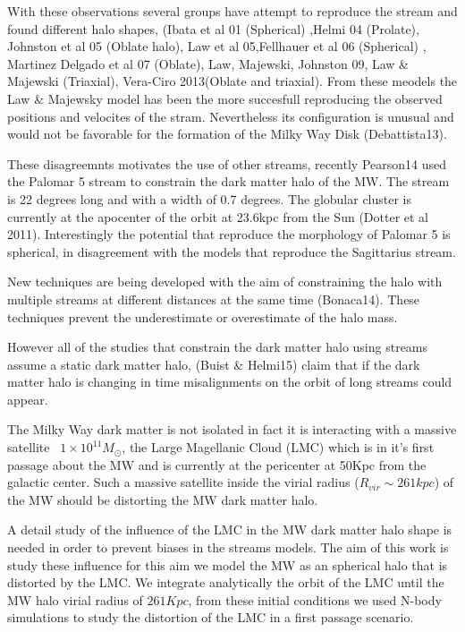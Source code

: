\vspace{16cm}

With these observations several groups have attempt to reproduce the stream and found 
different halo shapes, (Ibata et al 01 (Spherical)
,Helmi 04 (Prolate), Johnston et al 05 (Oblate halo), Law et al 05,Fellhauer et al 06 (Spherical)
, Martinez Delgado et al 07 (Oblate), Law, Majewski, Johnston 09, Law \& Majewski (Triaxial),
Vera-Ciro 2013(Oblate and triaxial). From these meodels the Law \& Majewsky model has been 
the more succesfull reproducing the observed positions and velocites of the stram. Nevertheless
its configuration is unusual and would not be favorable for the formation of the Milky Way Disk (Debattista13).

These disagreemnts motivates the use of other streams,
recently Pearson14 used the Palomar 5 stream to constrain the dark
matter halo of the MW. The stream is 22 degrees
long and with a width of 0.7 degrees. The globular cluster is currently at the
apocenter of the orbit at 23.6kpc from the Sun (Dotter et al 2011). Interestingly
the potential that reproduce the morphology of Palomar 5 is spherical, in
disagreement with the models that reproduce the Sagittarius stream.

New techniques are being developed with the aim of constraining the halo with multiple
streams at different distances at the same time (Bonaca14). These techniques 
prevent the underestimate or overestimate of the halo mass.

However all of the studies that constrain the dark matter halo using streams
assume a static dark matter halo, (Buist \& Helmi15) claim that if the dark matter
halo is changing in time misalignments on the orbit of long streams could appear.

The Milky Way dark matter is not isolated in fact it is interacting with a 
massive satellite ~$1\times10^{11}M_{\odot}$, the Large Magellanic Cloud (LMC)
which is in it's first passage about the MW and is currently at the pericenter
at 50Kpc from the galactic center. Such a massive satellite inside the virial 
radius ($R_{vir}\sim 261kpc$) of the MW should be distorting the MW dark matter
halo.

A detail study of the influence of the LMC in the MW dark matter halo
shape is needed in order to prevent biases in the streams models. 
The aim of this work is study these influence for this aim 
we model the MW as an spherical halo that is distorted by the LMC. We integrate 
analytically the orbit of the LMC until the MW halo virial radius of $261Kpc$, 
from these initial conditions we used N-body simulations to study the distortion 
of the LMC in a first passage scenario.   
  

